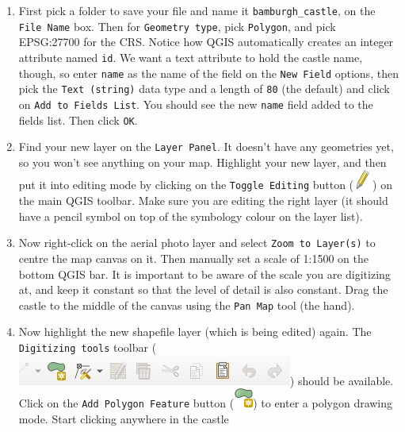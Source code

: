 \documentclass[
  letterpaper,
  DIV=11,
  numbers=noendperiod]{scrreprt}
\begin{document}
\begin{enumerate}
\def\labelenumi{(\arabic{enumi})}
\setcounter{enumi}{222}
\item
  First pick a folder to save your file and name it
  \texttt{bamburgh\_castle}, on the \texttt{File\ Name} box. Then for
  \texttt{Geometry\ type}, pick \texttt{Polygon}, and pick EPSG:27700
  for the CRS. Notice how QGIS automatically creates an integer
  attribute named \texttt{id}. We want a text attribute to hold the
  castle name, though, so enter \texttt{name} as the name of the field
  on the \texttt{New\ Field} options, then pick the
  \texttt{Text\ (string)} data type and a length of \texttt{80} (the
  default) and click on \texttt{Add\ to\ Fields\ List}. You should see
  the new \texttt{name} field added to the fields list. Then click
  \texttt{OK}.
\item
  Find your new layer on the \texttt{Layer\ Panel}. It doesn't have any
  geometries yet, so you won't see anything on your map. Highlight your
  new layer, and then put it into editing mode by clicking on the
  \texttt{Toggle\ Editing} button
  (\includegraphics{index_files/mediabag/mActionToggleEditing.png}) on
  the main QGIS toolbar. Make sure you are editing the right layer (it
  should have a pencil symbol on top of the symbology colour on the
  layer list).
\item
  Now right-click on the aerial photo layer and select
  \texttt{Zoom\ to\ Layer(s)} to centre the map canvas on it. Then
  manually set a scale of 1:1500 on the bottom QGIS bar. It is important
  to be aware of the scale you are digitizing at, and keep it constant
  so that the level of detail is also constant. Drag the castle to the
  middle of the canvas using the \texttt{Pan\ Map} tool (the hand).
\item
  Now highlight the new shapefile layer (which is being edited) again.
  The \texttt{Digitizing\ tools} toolbar
  (\includegraphics{images/lab_8/lab8_fig2_digi_tools.jpg}) should be
  available. Click on the \texttt{Add\ Polygon\ Feature} button
  (\includegraphics{index_files/mediabag/mActionCapturePolygo.png}) to
  enter a polygon drawing mode. Start clicking anywhere in the castle

\end{enumerate}
\end{document}

